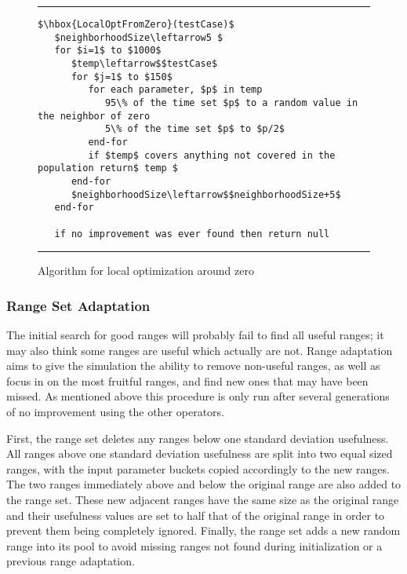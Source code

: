\documentclass[runningheads]{llncs}
\begin{document}
\begin{figure}[h!]
\begin{center}
\hrule
\medskip
\begin{Verbatim}[fontfamily=tt, xleftmargin=10pt, commandchars=\\\{\},
codes={\catcode`$=3\catcode`^=7\catcode`_=8}]
$\hbox{LocalOptFromZero}(testCase)$
   $neighborhoodSize\leftarrow5 $
   for $i=1$ to $1000$ 
      $temp\leftarrow$$testCase$
      for $j=1$ to $150$
         for each parameter, $p$ in temp
            95\% of the time set $p$ to a random value in the neighbor of zero
            5\% of the time set $p$ to $p/2$
         end-for     
         if $temp$ covers anything not covered in the population return$ temp $
      end-for
      $neighborhoodSize\leftarrow$$neighborhoodSize+5$
   end-for
		
   if no improvement was ever found then return null
\end{Verbatim}
\hrule
\end{center}
\caption{Algorithm for local optimization around zero \label{fig:lcOptFZ}}
\end{figure}
\FloatBarrier


\subsubsection{Range Set Adaptation} The initial search for good ranges will probably fail to find all useful ranges; it may also think some ranges are useful which actually are not. Range adaptation aims to give the simulation the ability to remove non-useful ranges, as well as focus in on the most fruitful ranges, and find new ones that may have been missed. As mentioned above this procedure is only run after several generations of no improvement using the other operators.

First, the range set deletes any ranges below one standard deviation usefulness. All ranges above one standard deviation usefulness are split into two equal sized ranges, with the input parameter buckets copied accordingly to the new ranges. The two ranges immediately above and below the original range are also added to the range set. These new adjacent ranges have the same size as the original range and their usefulness values are set to half that of the original range in order to prevent them being completely ignored. Finally, the range set adds a new random range into its pool to avoid missing ranges not found during initialization or a previous range adaptation.
\end{document}
